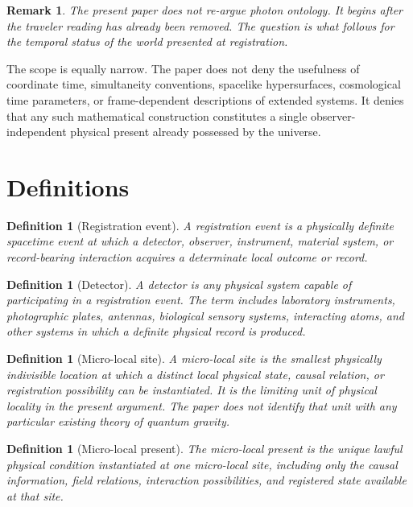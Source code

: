 \documentclass[12pt,onecolumn]{article}
\newtheorem{definition}[proposition]{Definition}
\newtheorem{remark}[proposition]{Remark}
\begin{document}
\begin{remark}
The present paper does not re-argue photon ontology. It begins after the traveler reading has already been removed. The question is what follows for the temporal status of the world presented at registration.
\end{remark}

The scope is equally narrow. The paper does not deny the usefulness of coordinate time, simultaneity conventions, spacelike hypersurfaces, cosmological time parameters, or frame-dependent descriptions of extended systems. It denies that any such mathematical construction constitutes a single observer-independent physical present already possessed by the universe.

\section{Definitions}

\begin{definition}[Registration event]
\label{def:registration}
A registration event is a physically definite spacetime event at which a detector, observer, instrument, material system, or record-bearing interaction acquires a determinate local outcome or record.
\end{definition}

\begin{definition}[Detector]
\label{def:detector}
A detector is any physical system capable of participating in a registration event. The term includes laboratory instruments, photographic plates, antennas, biological sensory systems, interacting atoms, and other systems in which a definite physical record is produced.
\end{definition}

\begin{definition}[Micro-local site]
\label{def:micro-site}
A micro-local site is the smallest physically indivisible location at which a distinct local physical state, causal relation, or registration possibility can be instantiated. It is the limiting unit of physical locality in the present argument. The paper does not identify that unit with any particular existing theory of quantum gravity.
\end{definition}

\begin{definition}[Micro-local present]
\label{def:micro-present}
The micro-local present is the unique lawful physical condition instantiated at one micro-local site, including only the causal information, field relations, interaction possibilities, and registered state available at that site.
\end{definition}
\end{document}
